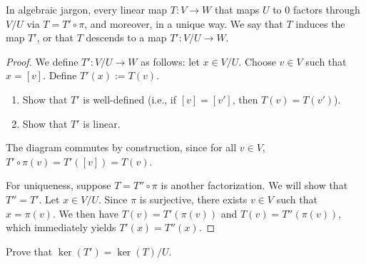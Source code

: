 \begin{remark}
  In algebraic jargon, every linear map $T \colon V \to W$ that maps $U$ to $0$ factors through $V/U$ via $T = T' \circ \pi$, and moreover, in a unique way. We say that $T$ induces the map $T'$, or that $T$ descends to a map $T' \colon V/U \to W$.
\end{remark}

\begin{proof}
  We define $T' \colon V/U \to W$ as follows: let $x \in V/U$. Choose $v \in V$ such that $x = [v]$. Define $T'(x) := T(v)$.

  \begin{exercise}
    \label{exc:induced_map_well_defined}
    \begin{enumerate}[label=\textbf{(\alph*)}]
      \item Show that $T'$ is well-defined (i.e., if $[v] = [v']$, then $T(v) = T(v')$).
      \item Show that $T'$ is linear.
    \end{enumerate}
\end{exercise}

  The diagram commutes by construction, since for all $v \in V$, $T' \circ \pi(v) = T'([v]) = T(v)$.

  For uniqueness, suppose $T = T'' \circ \pi$ is another factorization. We will show that $T'' = T'$. Let $x \in V/U$. Since $\pi$ is surjective, there exists $v \in V$ such that $x = \pi(v)$. We then have $T(v) = T'(\pi(v))$ and $T(v) = T''(\pi(v))$, which immediately yields $T'(x) = T''(x)$.
\end{proof}

\begin{exercise}
  \label{exc:kernel_induced_map}
  Prove that $\ker(T') = \ker(T)/U$.
\end{exercise}


